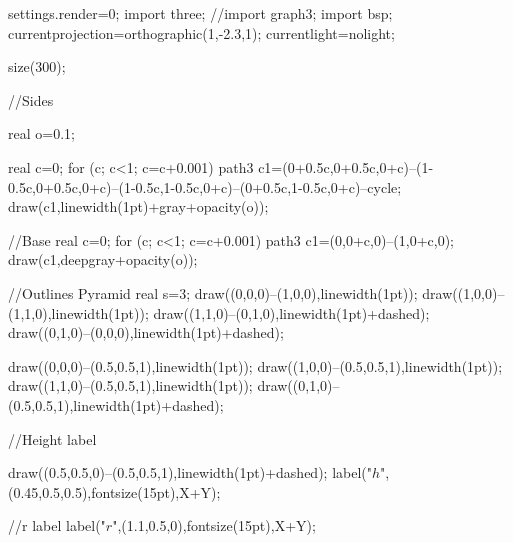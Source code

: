   	settings.render=0;
	import three;
    //import graph3;
    import bsp;
    currentprojection=orthographic(1,-2.3,1);
    currentlight=nolight;

	size(300);
    
    
    //Sides
    
    real o=0.1;
    
   	real c=0;
    for (c; c<1; c=c+0.001)
    {
        path3 c1=(0+0.5c,0+0.5c,0+c)--(1-0.5c,0+0.5c,0+c)--(1-0.5c,1-0.5c,0+c)--(0+0.5c,1-0.5c,0+c)--cycle;
    	draw(c1,linewidth(1pt)+gray+opacity(o));
    }
    
    //Base
   	real c=0;
    for (c; c<1; c=c+0.001)
    {
        path3 c1=(0,0+c,0)--(1,0+c,0);
    	draw(c1,deepgray+opacity(o));
    }

 
 	//Outlines Pyramid
    real s=3;
    draw((0,0,0)--(1,0,0),linewidth(1pt));
    draw((1,0,0)--(1,1,0),linewidth(1pt));
    draw((1,1,0)--(0,1,0),linewidth(1pt)+dashed);
    draw((0,1,0)--(0,0,0),linewidth(1pt)+dashed);
    
    draw((0,0,0)--(0.5,0.5,1),linewidth(1pt));
    draw((1,0,0)--(0.5,0.5,1),linewidth(1pt));
    draw((1,1,0)--(0.5,0.5,1),linewidth(1pt));
    draw((0,1,0)--(0.5,0.5,1),linewidth(1pt)+dashed);
    
    
    //Height label
    
    draw((0.5,0.5,0)--(0.5,0.5,1),linewidth(1pt)+dashed);
    label("$h$",(0.45,0.5,0.5),fontsize(15pt),X+Y);
    
    //r label
    label("$r$",(1.1,0.5,0),fontsize(15pt),X+Y);